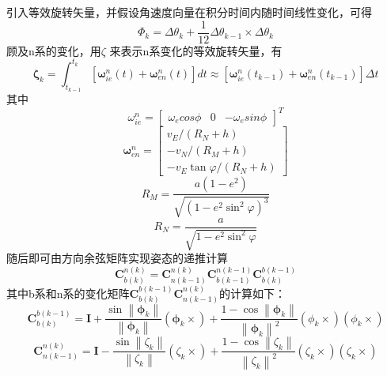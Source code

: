 \documentclass{ctexart}
\begin{document}
引入等效旋转矢量，并假设角速度向量在积分时间内随时间线性变化，可得
\begin{equation}
\Phi_k=\Delta\theta_k+\frac{1}{12}\Delta\theta_{k-1}\times\Delta\theta_k
\label{eq:7}
\end{equation}
顾及n系的变化，用$\zeta$ 来表示n系变化的等效旋转矢量，有
\begin{equation}
\boldsymbol{\zeta}_{k}=\int_{t_{k-1}}^{t_{k}}\left[\boldsymbol{\omega}_{i e}^{n}(t)+\boldsymbol{\omega}_{e n}^{n}(t)\right] d t \approx\left[\boldsymbol{\omega}_{i e}^{n}\left(t_{k-1}\right)+\boldsymbol{\omega}_{e n}^{n}\left(t_{k-1}\right)\right] \Delta t
\end{equation}
其中
\begin{equation}
\omega^n_{ie}=\begin{bmatrix}
\omega_ecos\phi&0&-\omega_esin\phi
\end{bmatrix}^T
\end{equation}
\begin{equation}
\boldsymbol{\omega}_{e n}^{n}=\left[\begin{array}{c}
v_{E} /\left(R_{N}+h\right) \\
-v_{N} /\left(R_{M}+h\right) \\
-v_{E} \tan \varphi /\left(R_{N}+h\right)
\end{array}\right]
\end{equation}
\begin{equation}
R_{M}=\frac{a\left(1-e^{2}\right)}{\sqrt{\left(1-e^{2} \sin ^{2} \varphi\right)^{3}}}
\end{equation}
\begin{equation}
R_{N}=\frac{a}{\sqrt{1-e^{2} \sin ^{2} \varphi}}
\end{equation}
随后即可由方向余弦矩阵实现姿态的递推计算
\begin{equation}
\mathbf{C}^{n(k)}_{b(k)}=\mathbf{C}^{n(k)}_{n(k-1)}\mathbf{C}^{n(k-1)}_{b(k-1)}\mathbf{C}^{b(k-1)}_{b(k)}
\end{equation}
其中b系和n系的变化矩阵$\mathbf{C}^{b(k-1)}_{b(k)}$$\mathbf{C}^{n(k)}_{n(k-1)}$的计算如下：
\begin{equation}
\mathbf{C}_{b(k)}^{b(k-1)}=\mathbf{I}+\frac{\sin \left\|\boldsymbol{\phi}_{k}\right\|}{\left\|\boldsymbol{\phi}_{k}\right\|}\left(\boldsymbol{\phi}_{k} \times\right)+\frac{1-\cos \left\|\boldsymbol{\phi}_{k}\right\|}{\left\|\boldsymbol{\phi}_{k}\right\|^{2}}\left(\phi_{k} \times\right)\left(\phi_{k} \times\right)
\end{equation}
\begin{equation}
\mathbf{C}_{n(k-1)}^{n(k)}=\mathbf{I}-\frac{\sin \left\|\zeta_{k}\right\|}{\left\|\zeta_{k}\right\|}\left(\zeta_{k} \times\right)+\frac{1-\cos \left\|\zeta_{k}\right\|}{\left\|\zeta_{k}\right\|^{2}}\left(\zeta_{k} \times\right)\left(\zeta_{k} \times\right)
\end{equation}
\end{document}
